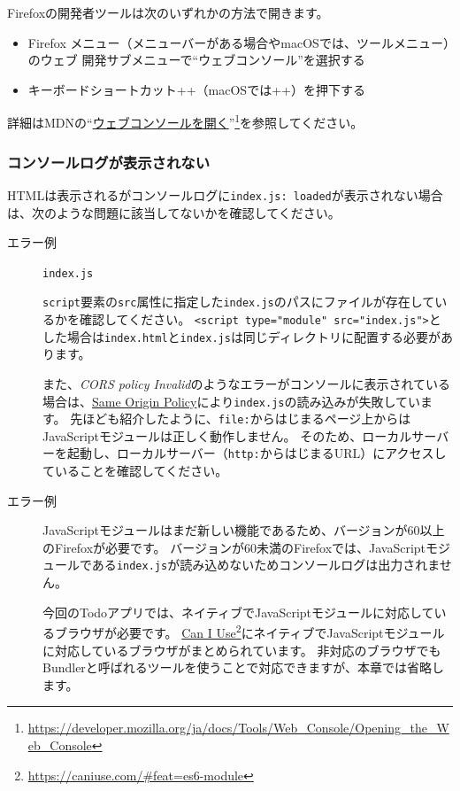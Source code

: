 Firefoxの開発者ツールは次のいずれかの方法で開きます。

\begin{itemize}
\item
  Firefox
  メニュー（メニューバーがある場合やmacOSでは、ツールメニュー）のウェブ
  開発サブメニューで``ウェブコンソール''を選択する
\item
  キーボードショートカット++（macOSでは++）を押下する
\end{itemize}

詳細はMDNの``\href{https://developer.mozilla.org/ja/docs/Tools/Web_Console/Opening_the_Web_Console}{ウェブコンソールを開く}''\footnote{\url{https://developer.mozilla.org/ja/docs/Tools/Web_Console/Opening_the_Web_Console}}を参照してください。

\hypertarget{error-not-display-console-log}{%
\subsubsection{コンソールログが表示されない}\label{error-not-display-console-log}}

HTMLは表示されるがコンソールログに\texttt{index.js: loaded}が表示されない場合は、次のような問題に該当してないかを確認してください。

\begin{description}
\item[エラー例] \texttt{index.js}

\texttt{script}要素の\texttt{src}属性に指定した\texttt{index.js}のパスにファイルが存在しているかを確認してください。
\texttt{<script type="module" src="index.js">}とした場合は\texttt{index.html}と\texttt{index.js}は同じディレクトリに配置する必要があります。

また、\emph{CORS policy
Invalid}のようなエラーがコンソールに表示されている場合は、\href{https://developer.mozilla.org/ja/docs/Web/Security/Same-origin_policy}{Same
Origin
Policy}により\texttt{index.js}の読み込みが失敗しています。
先ほども紹介したように、\texttt{file:}からはじまるページ上からはJavaScriptモジュールは正しく動作しません。
そのため、ローカルサーバーを起動し、ローカルサーバー（\texttt{http:}からはじまるURL）にアクセスしていることを確認してください。

\item[エラー例] 

JavaScriptモジュールはまだ新しい機能であるため、バージョンが60以上のFirefoxが必要です。
バージョンが60未満のFirefoxでは、JavaScriptモジュールである\texttt{index.js}が読み込めないためコンソールログは出力されません。

今回のTodoアプリでは、ネイティブでJavaScriptモジュールに対応しているブラウザが必要です。
\href{https://caniuse.com/\#feat=es6-module}{Can I
Use}\footnote{\url{https://caniuse.com/\#feat=es6-module}}にネイティブでJavaScriptモジュールに対応しているブラウザがまとめられています。
非対応のブラウザでもBundlerと呼ばれるツールを使うことで対応できますが、本章では省略します。
\end{description}

